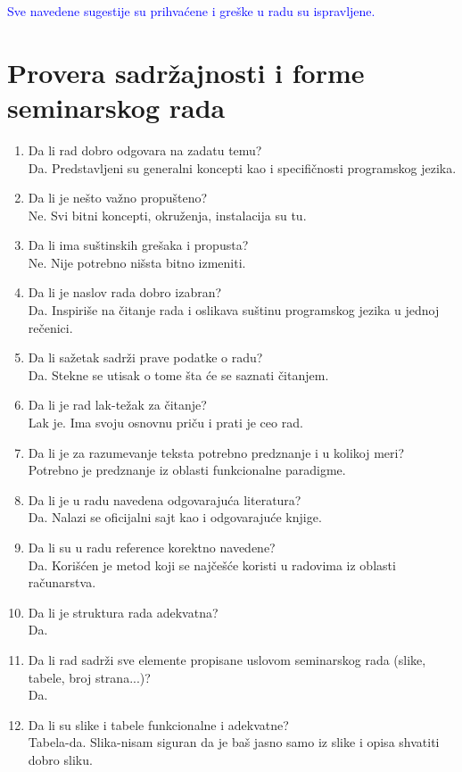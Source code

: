 \documentclass[a4paper]{report}
\newcommand{\odgovor}[1]{\textcolor{blue}{#1}}
\begin{document}
\odgovor{Sve navedene sugestije su prihvaćene i greške u radu su ispravljene.}


\section{Provera sadržajnosti i forme seminarskog rada}

\begin{enumerate}
\item Da li rad dobro odgovara na zadatu temu?\\Da. Predstavljeni su generalni koncepti kao i specifičnosti programskog jezika.
\item Da li je nešto važno propušteno?\\Ne. Svi bitni koncepti, okruženja, instalacija su tu.
\item Da li ima suštinskih grešaka i propusta?\\Ne. Nije potrebno nišsta bitno izmeniti.
\item Da li je naslov rada dobro izabran?\\Da. Inspiriše na čitanje rada i oslikava suštinu programskog jezika u jednoj rečenici.
\item Da li sažetak sadrži prave podatke o radu?\\ Da. Stekne se utisak o tome šta će se saznati čitanjem.
\item Da li je rad lak-težak za čitanje?\\Lak je. Ima svoju osnovnu priču i prati je ceo rad.
\item Da li je za razumevanje teksta potrebno predznanje i u kolikoj meri?\\Potrebno je predznanje iz oblasti funkcionalne paradigme.
\item Da li je u radu navedena odgovarajuća literatura?\\Da. Nalazi se oficijalni sajt kao i odgovarajuće knjige.
\item Da li su u radu reference korektno navedene?\\Da. Korišćen je metod koji se najčešće koristi u radovima iz oblasti računarstva.
\item Da li je struktura rada adekvatna?\\Da.
\item Da li rad sadrži sve elemente propisane uslovom seminarskog rada (slike, tabele, broj strana...)?\\Da.
\item Da li su slike i tabele funkcionalne i adekvatne?\\Tabela-da. Slika-nisam siguran da je baš jasno samo iz slike i opisa shvatiti dobro sliku.
\end{enumerate}
\end{document}
